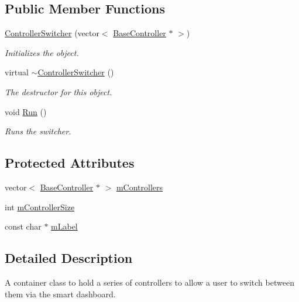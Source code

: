 \subsection*{\-Public \-Member \-Functions}
\begin{DoxyCompactItemize}
\item 
\hyperlink{class_controller_switcher_ac78e49b77d1b1b9c7822fb1c0056802f}{\-Controller\-Switcher} (vector$<$ \hyperlink{class_base_controller}{\-Base\-Controller} $\ast$ $>$)
\begin{DoxyCompactList}\small\item\em \-Initializes the object. \end{DoxyCompactList}\item 
virtual \hyperlink{class_controller_switcher_ad3dec9447553ace17816616fd6c3391b}{$\sim$\-Controller\-Switcher} ()
\begin{DoxyCompactList}\small\item\em \-The destructor for this object. \end{DoxyCompactList}\item 
void \hyperlink{class_controller_switcher_a5ddbffba9ab01afe511927a3e37e0a35}{\-Run} ()
\begin{DoxyCompactList}\small\item\em \-Runs the switcher. \end{DoxyCompactList}\end{DoxyCompactItemize}
\subsection*{\-Protected \-Attributes}
\begin{DoxyCompactItemize}
\item 
vector$<$ \hyperlink{class_base_controller}{\-Base\-Controller} $\ast$ $>$ \hyperlink{class_controller_switcher_a14fc6d608b0d3b913ba4d4cac3b67f5c}{m\-Controllers}
\item 
int \hyperlink{class_controller_switcher_a1164e2c738ef79e459880bdb66e2f7f9}{m\-Controller\-Size}
\item 
const char $\ast$ \hyperlink{class_controller_switcher_a9c56a431ba8c92a669972199e072306a}{m\-Label}
\end{DoxyCompactItemize}


\subsection{\-Detailed \-Description}
\-A container class to hold a series of controllers to allow a user to switch between them via the smart dashboard. 

